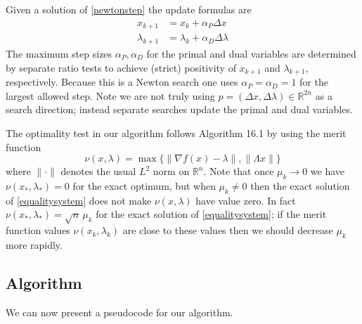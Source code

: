 \documentclass[11pt]{article}
\newcommand{\RR}{\mathbb{R}}
\newcommand{\grad}{\nabla}
\begin{document}
Given a solution of \eqref{newtonstep} the update formulas are
\begin{align*}
x_{k+1} &= x_k + \alpha_P \Delta x \\
\lambda_{k+1} &= \lambda_k + \alpha_D \Delta \lambda
\end{align*}
The maximum step sizes $\alpha_P,\alpha_D$ for the primal and dual variables are determined by separate ratio tests to achieve (strict) positivity of $x_{k+1}$ and $\lambda_{k+1}$, respectively.  Because this is a Newton search one uses $\alpha_P=\alpha_D=1$ for the largest allowed step.  Note we are not truly using $p=(\Delta x,\Delta \lambda) \in \RR^{2n}$ as a search direction; instead separate searches update the primal and dual variables.

The optimality test in our algorithm follows Algorithm 16.1 by using the merit function
    $$\nu(x,\lambda) = \max\{\|\grad f(x)-\lambda\|,\|\Lambda x\|\}$$
where $\|\cdot\|$ denotes the usual $L^2$ norm on $\RR^n$.  Note that once $\mu_k\to 0$ we have $\nu(x_*,\lambda_*) = 0$ for the exact optimum, but when $\mu_k \ne 0$ then the exact solution of \eqref{equalitysystem} does not make $\nu(x,\lambda)$ have value zero.  In fact $\nu(x_*,\lambda_*) = \sqrt{n}\, \mu_k$ for the exact solution of \eqref{equalitysystem}; if the merit function values $\nu(x_k,\lambda_k)$ are close to these values then we should decrease $\mu_k$ more rapidly.


\subsection*{Algorithm}

We can now present a pseudocode for our algorithm.
\end{document}
